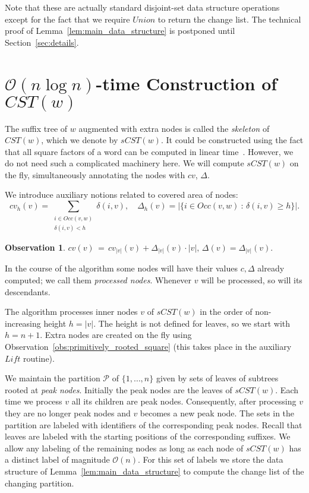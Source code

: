\documentclass{article}
\theoremstyle{theorem}
\newtheorem{observation}{Observation}
\theoremstyle{definition}
\newcommand{\CST}{\mathit{CST}}
\newcommand{\sCST}{\mathit{sCST}}
\newcommand{\extend}{\Delta}
\newcommand{\Occ}{\mathit{Occ}}
\renewcommand{\c}{\mathit{cv}}
\newcommand{\Oh}{\mathcal{O}}
\newcommand{\Lift}{\mathit{Lift}}
\newcommand{\PP}{\mathcal{P}}
\newcommand{\union}{\mathit{Union}}
\begin{document}
  Note that these are actually standard disjoint-set data structure operations except for the fact that
  we require $\union$ to return the change list.
  The technical proof of Lemma~\ref{lem:main_data_structure} is postponed until Section~\ref{sec:details}.


  \section{$\Oh(n \log n)$-time Construction of $\CST(w)$}\label{sec:CST_construction}
  The suffix tree of $w$ augmented with extra nodes is called the
  \emph{skeleton} of $\CST(w)$, which we denote by $\sCST(w)$.
  It could be constructed using the fact that all square factors of a word can be
  computed in linear time~\cite{DBLP:journals/jcss/GusfieldS04,Crochemore2013,DBLP:conf/spire/CrochemoreIKRRW10}.
  However, we do not need such a complicated machinery here.
  We will compute $\sCST(w)$ on the fly, simultaneously annotating the nodes with $\c$, $\Delta$.

  We introduce auxiliary notions related to covered area of nodes:
  $$\c_h(v)=\sum_{\substack{i\in \Occ(v,w)\\\delta(i,v)<h}} \delta(i,v),\quad\extend_h(v)=|\{i\in \Occ(v,w)\ :\, \delta(i,v) \ge h \}|.$$

  \begin{observation}
    $\c(v)\,=\, \c_{|v|}(v)+\extend_{|v|}(v)\cdot |v|,\,
    \Delta(v)=\extend_{|v|}(v).$
  \end{observation}

  \noindent
  In the course of the algorithm some nodes will have their values $c,\Delta$ already computed;
  we call them \emph{processed nodes}.
  Whenever $v$ will be processed, so will its descendants.
    
  The algorithm processes inner nodes $v$ of $\sCST(w)$ in the order of non-increasing height $h=|v|$.
  The height is not defined for leaves, so we start with $h=n+1$.
  Extra nodes are created on the fly using Observation~\ref{obs:primitively_rooted_square}
  (this takes place in the auxiliary $\Lift$ routine).

  We maintain the partition $\PP$ of $\{1,\ldots, n\}$ given by sets of leaves of subtrees
  rooted at \emph{peak nodes}.
  Initially the peak nodes are the leaves of $\sCST(w)$.
  Each time we process $v$ all its children are peak nodes.
  Consequently, after processing $v$ they are no longer peak nodes and $v$ becomes a new peak node.
  The sets in the partition are labeled with identifiers of the
  corresponding peak nodes.
  Recall that leaves are labeled with the starting positions of the corresponding suffixes. 
  We allow any labeling of the remaining nodes as long as each node of
  $\sCST(w)$ has a distinct label of magnitude $\Oh(n)$.
  For this set of labels we store the data structure of Lemma~\ref{lem:main_data_structure}
  to compute the change list of the changing partition.
\end{document}
